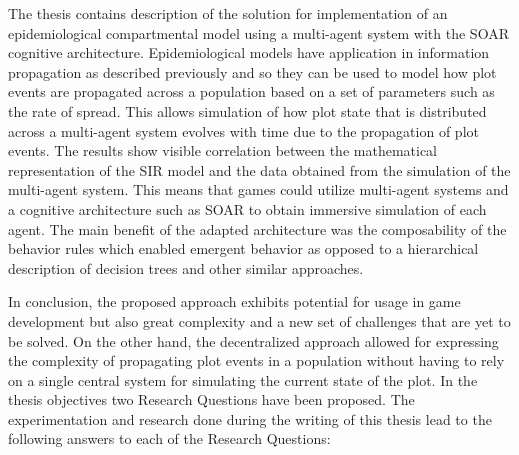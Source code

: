 \label{chapter:conclusions}

The thesis contains description of the solution for implementation of an epidemiological compartmental model using a multi-agent system with the SOAR cognitive architecture.
Epidemiological models have application in information propagation as described previously and so they can be used to model how plot events are propagated across a population based on a set of parameters such as the rate of spread.
This allows simulation of how plot state that is distributed across a multi-agent system evolves with time due to the propagation of plot events.
The results show visible correlation between the mathematical representation of the SIR model and the data obtained from the simulation of the multi-agent system.
This means that games could utilize multi-agent systems and a cognitive architecture such as SOAR to obtain immersive simulation of each agent.
The main benefit of the adapted architecture was the composability of the behavior rules which enabled emergent behavior as opposed to a hierarchical description of decision trees and other similar approaches.

In conclusion, the proposed approach exhibits potential for usage in game development but also great complexity and a new set of challenges that are yet to be solved.
On the other hand, the decentralized approach allowed for expressing the complexity of propagating plot events in a population without having to rely on a single central system for simulating the current state of the plot.
In the thesis objectives two Research Questions have been proposed.
The experimentation and research done during the writing of this thesis lead to the following answers to each of the Research Questions:


